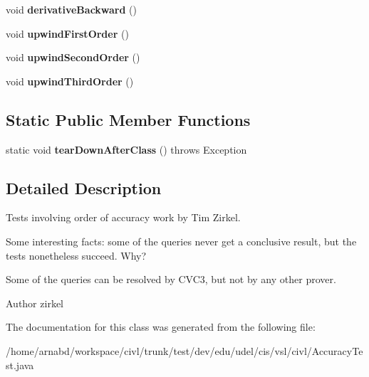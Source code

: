 \begin{DoxyCompactItemize}
\item 
\hypertarget{classedu_1_1udel_1_1cis_1_1vsl_1_1civl_1_1AccuracyTest_a6de6931999d62bf5e4721cbd932ebc19}{}void {\bfseries derivative\+Backward} ()\label{classedu_1_1udel_1_1cis_1_1vsl_1_1civl_1_1AccuracyTest_a6de6931999d62bf5e4721cbd932ebc19}

\item 
\hypertarget{classedu_1_1udel_1_1cis_1_1vsl_1_1civl_1_1AccuracyTest_a278ff9d0886174f74f7dae3beb713b90}{}void {\bfseries upwind\+First\+Order} ()\label{classedu_1_1udel_1_1cis_1_1vsl_1_1civl_1_1AccuracyTest_a278ff9d0886174f74f7dae3beb713b90}

\item 
\hypertarget{classedu_1_1udel_1_1cis_1_1vsl_1_1civl_1_1AccuracyTest_a8985b3d6aae1e6f1ea14065cfbe33da9}{}void {\bfseries upwind\+Second\+Order} ()\label{classedu_1_1udel_1_1cis_1_1vsl_1_1civl_1_1AccuracyTest_a8985b3d6aae1e6f1ea14065cfbe33da9}

\item 
\hypertarget{classedu_1_1udel_1_1cis_1_1vsl_1_1civl_1_1AccuracyTest_ac1a68ad837249a9b8873c497456ca9a2}{}void {\bfseries upwind\+Third\+Order} ()\label{classedu_1_1udel_1_1cis_1_1vsl_1_1civl_1_1AccuracyTest_ac1a68ad837249a9b8873c497456ca9a2}

\end{DoxyCompactItemize}
\subsection*{Static Public Member Functions}
\begin{DoxyCompactItemize}
\item 
\hypertarget{classedu_1_1udel_1_1cis_1_1vsl_1_1civl_1_1AccuracyTest_a0889ceeccf3c87f9fce7f5dc9cbe2801}{}static void {\bfseries tear\+Down\+After\+Class} ()  throws Exception \label{classedu_1_1udel_1_1cis_1_1vsl_1_1civl_1_1AccuracyTest_a0889ceeccf3c87f9fce7f5dc9cbe2801}

\end{DoxyCompactItemize}


\subsection{Detailed Description}
Tests involving order of accuracy work by Tim Zirkel. 

Some interesting facts\+: some of the queries never get a conclusive result, but the tests nonetheless succeed. Why?

Some of the queries can be resolved by C\+V\+C3, but not by any other prover.

\begin{DoxyAuthor}{Author}
zirkel 
\end{DoxyAuthor}


The documentation for this class was generated from the following file\+:\begin{DoxyCompactItemize}
\item 
/home/arnabd/workspace/civl/trunk/test/dev/edu/udel/cis/vsl/civl/Accuracy\+Test.\+java\end{DoxyCompactItemize}
